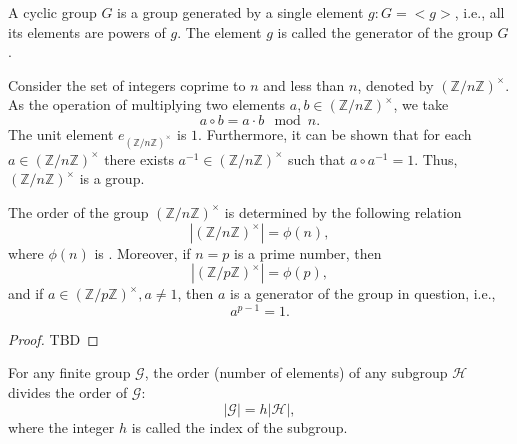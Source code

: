 \begin{definition}
A cyclic group $G$ is a group generated by a single element $g: G = <g>$, i.e., all its elements are powers of $g$. The element $g$ is called the generator of the group $G$.
\label{def:add:algebra:cyclic_group}
\end{definition}

\begin{definition}
Consider the set of integers coprime to $n$ and less than $n$, denoted by $\left(\mathbb{Z}/n\mathbb{Z}\right)^\times$. As the operation of multiplying two elements $a,b \in \left(\mathbb{Z}/n\mathbb{Z}\right)^\times$, we take
\[
a \circ b = a \cdot b \mod n.
\]
The unit element $e_{\left(\mathbb{Z}/n\mathbb{Z}\right)^\times}$ is $1$. Furthermore, it can be shown that for each $a \in \left(\mathbb{Z}/n\mathbb{Z}\right)^\times$ there exists $a^{-1} \in \left(\mathbb{Z}/n\mathbb{Z}\right)^\times$ such that $a \circ a^{-1} = 1$. Thus, $\left(\mathbb{Z}/n\mathbb{Z}\right)^\times$ is a group.
\label{def:add:algebra:mult_group}
\end{definition}

\begin{theorem}
The order of the group $\left(\mathbb{Z}/n\mathbb{Z}\right)^\times$ is determined by the following relation
\[
\left|\left(\mathbb{Z}/n\mathbb{Z}\right)^\times\right| = \phi(n),
\]
where $\phi(n)$ is . Moreover, if 
$n=p$ is a prime number, then
\[
\left|\left(\mathbb{Z}/p\mathbb{Z}\right)^\times\right| = \phi(p),
\]
and if $a \in \left(\mathbb{Z}/p\mathbb{Z}\right)^\times, a \ne 1$,
then $a$ is a generator of the group in question, i.e.,
\[
a^{p-1} = 1.
\]
\begin{proof}
TBD
\end{proof}
\label{thm:add:algebra:cyclic_mult_group}
\end{theorem}

\begin{theorem}[Lagrange]
\label{thm:lagrange}
For any finite group $\mathcal{G}$, the order (number of elements) of any subgroup $\mathcal{H}$ divides the order of $\mathcal{G}$:
\[
\left|\mathcal{G}\right| = h \left|\mathcal{H}\right|,
\] 
where the integer $h$ is called the index of the subgroup.
\end{theorem}